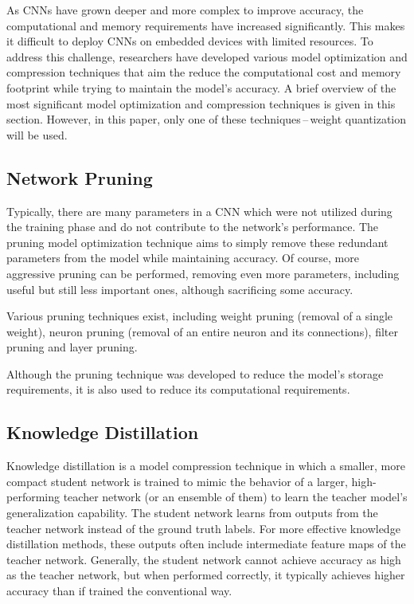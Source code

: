 As CNNs have grown deeper and more complex to improve accuracy, the
computational and memory requirements have increased significantly. This makes
it difficult to deploy CNNs on embedded devices with limited resources. To
address this challenge, researchers have developed various model optimization
and compression techniques that aim the reduce the computational cost and memory
footprint while trying to maintain the model's accuracy. A brief overview of the
most significant model optimization and compression techniques is given in this
section. However, in this paper, only one of these techniques\,--\,weight
quantization will be used.


\subsection{Network Pruning}

Typically, there are many parameters in a CNN which were not utilized during the
training phase and do not contribute to the network's performance. The pruning
model optimization technique aims to simply remove these redundant parameters
from the model while maintaining accuracy. Of course, more aggressive pruning
can be performed, removing even more parameters, including useful but still less
important ones, although sacrificing some accuracy.

Various pruning techniques exist, including weight pruning (removal of a single
weight), neuron pruning (removal of an entire neuron and its connections),
filter pruning and layer pruning.

Although the pruning technique was developed to reduce the model's storage
requirements, it is also used to reduce its computational requirements.



\subsection{Knowledge Distillation}

Knowledge distillation is a model compression technique in which a smaller, more
compact student network is trained to mimic the behavior of a larger,
high-performing teacher network (or an ensemble of them) to learn the teacher
model's generalization capability. The student network learns from outputs from
the teacher network instead of the ground truth labels. For more effective
knowledge distillation methods, these outputs often include intermediate feature
maps of the teacher network. Generally, the student network cannot achieve
accuracy as high as the teacher network, but when performed correctly, it
typically achieves higher accuracy than if trained the conventional way.

